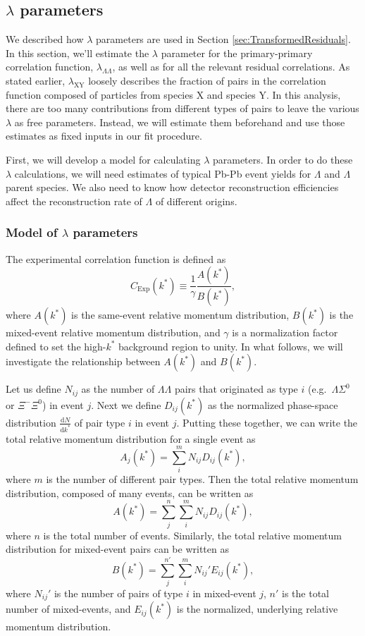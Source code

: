\subsection{$\lambda$ parameters}
\label{sec:LambdaParams}

We described how $\lambda$ parameters are used in Section \ref{sec:TransformedResiduals}. In this section, we'll estimate the $\lambda$ parameter for the primary-primary correlation function, $\lambda_{\Lambda\Lambda}$, as well as for all the relevant residual correlations.
As stated earlier, $\lambda_\mathrm{XY}$ loosely describes the fraction of pairs in the correlation function composed of particles from species X and species Y.
In this analysis, there are too many contributions from different types of pairs to leave the various $\lambda$ as free parameters.
Instead, we will estimate them beforehand and use those estimates as fixed inputs in our fit procedure.

First, we will develop a model for calculating $\lambda$ parameters. 
In order to do these $\lambda$ calculations, we will need estimates of typical Pb-Pb event yields for $\Lambda$ and $\Lambda$ parent species.
We also need to know how detector reconstruction efficiencies affect the reconstruction rate of $\Lambda$ of different origins.

\subsubsection{Model of $\lambda$ parameters}
\label{sec:LambdaModel}

The experimental correlation function is defined as 
\begin{equation}
\label{eq:ExpCorrelationFunction}
C_{\mathrm{Exp}}(k^*) \equiv \frac{1}{\gamma} \frac{A(k^*)}{B(k^*)},
\end{equation}
where $A(k^*)$ is the same-event relative momentum distribution, $B(k^*)$ is the mixed-event relative momentum distribution, and $\gamma$ is a normalization factor defined to set the high-$k^*$ background region to unity. 
In what follows, we will investigate the relationship between $A(k^*)$ and $B(k^*)$. 


Let us define $N_{ij}$ as the number of $\Lambda\Lambda$ pairs that originated as type $i$ (e.g.\ $\Lambda\Sigma^0$ or $\Xi^-\Xi^0$) in event $j$.
Next we define $D_{ij}(k^*)$ as the normalized phase-space distribution $\frac{\mathrm{d}N}{\mathrm{d}k^*}$ of pair type $i$ in event $j$. 
Putting these together, we can write the total relative momentum distribution for a single event as
$$A_j(k^*) = \sum_i^m N_{ij} D_{ij}(k^*),$$
where $m$ is the number of different pair types.
Then the total relative momentum distribution, composed of many events, can be written as
$$A(k^*) = \sum_j^n \sum_i^m N_{ij} D_{ij}(k^*),$$
where $n$ is the total number of events.
Similarly, the total relative momentum distribution for mixed-event pairs can be written as
$$B(k^*) = \sum_j^{n'} \sum_i^m N_{ij}' E_{ij}(k^*),$$
where $N_{ij}'$ is the number of pairs of type $i$ in mixed-event $j$, $n'$ is the total number of mixed-events, and $E_{ij}(k^*)$ is the normalized, underlying relative momentum distribution.

